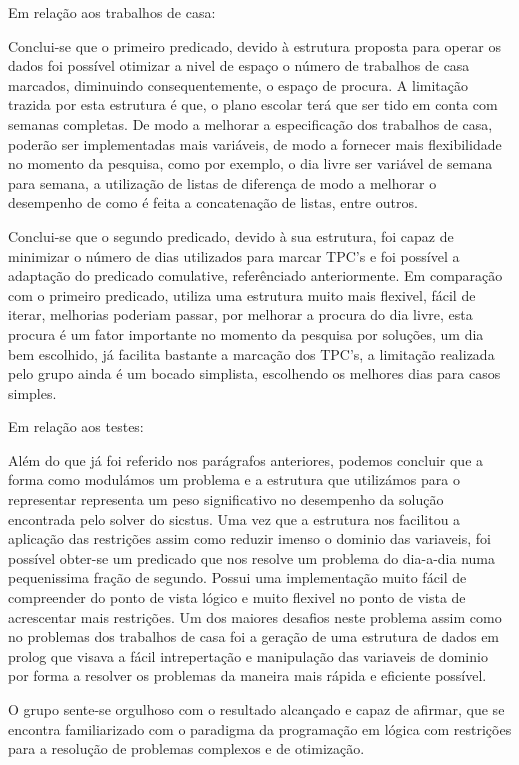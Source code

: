 \documentclass{llncs}
\begin{document}
Em relação aos trabalhos de casa:

Conclui-se que o primeiro predicado, devido à estrutura proposta para operar os dados foi possível otimizar a nivel de espaço o número de trabalhos de casa marcados, diminuindo consequentemente, o espaço de procura. A limitação trazida por esta estrutura é que, o plano escolar terá que ser tido em conta com semanas completas.  De modo a melhorar a especificação dos trabalhos de casa, poderão ser implementadas mais variáveis, de modo a fornecer mais flexibilidade no momento da pesquisa, como por exemplo, o dia livre ser variável de semana para semana, a utilização de listas de diferença de modo a melhorar o desempenho de como é feita a concatenação de listas, entre outros.

Conclui-se que o segundo predicado, devido à sua estrutura, foi capaz de minimizar o número de dias utilizados para marcar TPC's e foi possível a adaptação do predicado comulative, referênciado anteriormente. Em comparação com o primeiro predicado, utiliza uma estrutura muito mais flexivel, fácil de iterar, melhorias poderiam passar, por melhorar a procura do dia livre, esta procura é um fator importante no momento da pesquisa por soluções, um dia bem escolhido, já facilita bastante a marcação dos TPC's, a limitação realizada pelo grupo ainda é um bocado simplista, escolhendo os melhores dias para casos simples.

Em relação aos testes:

Além do que já foi referido nos parágrafos anteriores, podemos concluir que a forma como modulámos um problema e a estrutura que utilizámos para o representar representa um peso significativo no desempenho da solução encontrada pelo solver do sicstus. Uma vez que a estrutura nos facilitou a aplicação das restrições assim como reduzir imenso o dominio das variaveis, foi possível obter-se um predicado que nos resolve um problema do dia-a-dia numa pequenissima fração de segundo. Possui uma implementação muito fácil de compreender do ponto de vista lógico e muito flexivel no ponto de vista de acrescentar mais restrições. Um dos maiores desafios neste problema assim como no problemas dos trabalhos de casa foi a geração de uma estrutura de dados em prolog que visava a fácil intrepertação e manipulação das variaveis de dominio por forma a resolver os problemas da maneira mais rápida e eficiente possível.

O grupo sente-se orgulhoso com o resultado alcançado e capaz de afirmar, que se encontra familiarizado com o paradigma da programação em lógica com restrições para a resolução de problemas complexos e de otimização.
\end{document}
